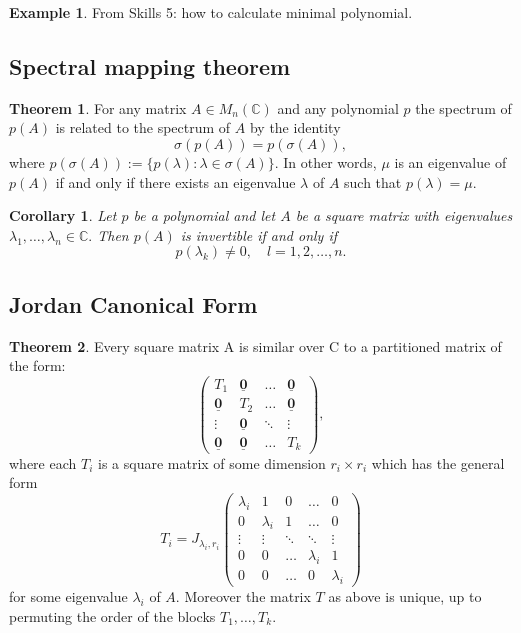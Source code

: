 \documentclass[12pt, a4paper]{article}
\newcommand{\bb}[1]{\mathbb{#1}}
\theoremstyle{definition}
\newtheorem{theorem}{Theorem}[section]
\newtheorem*{example}{Example}
\theoremstyle{plain}
\newtheorem{corollary}{Corollary}[theorem]
\begin{document}
\begin{example}
From Skills 5: how to calculate minimal polynomial.

\end{example}

\subsection{Spectral mapping theorem}

\begin{theorem}
For any matrix $A \in M_n(\bb{C})$ and any polynomial $p$ the spectrum of $p(A)$ is related to the spectrum of $A$ by the identity $$\sigma(p(A))=p(\sigma(A)),$$ where $p(\sigma(A)):=\{p(\lambda) : \lambda \in \sigma(A)\}.$ In other words, $\mu$ is an eigenvalue of $p(A)$ if and only if there exists an eigenvalue $\lambda$ of $A$ such that $p(\lambda) = \mu.$
\end{theorem}

\begin{corollary}
Let $p$ be a polynomial and let $A$ be a square matrix with eigenvalues $\lambda_1,\ldots,\lambda_n \in \bb{C}.$ Then $p(A)$ is invertible if and only if $$p(\lambda_k)\neq 0, \quad l=1,2,\ldots,n.$$
\end{corollary}

\subsection{Jordan Canonical Form}

\begin{theorem}
Every square matrix A is similar over C to a partitioned matrix of the form: $$\begin{pmatrix} T_1 & \underline{\mathbf{0}} & \ldots & \underline{\mathbf{0}} \\ \underline{\mathbf{0}} & T_2 & \ldots & \underline{\mathbf{0}} \\ \vdots & \underline{\mathbf{0}} & \ddots & \vdots \\ \underline{\mathbf{0}} & \underline{\mathbf{0}} & \ldots & T_k \end{pmatrix},$$ where each $T_i$ is a square matrix of some dimension $r_i \times r_i$ which has the general form $$T_i=J_{\lambda_i,r_i}\begin{pmatrix} \lambda_i&1&0&\ldots&0 \\ 0&\lambda_i&1&\ldots&0 \\ \vdots&\vdots&\ddots&\ddots&\vdots \\ 0&0&\ldots&\lambda_i&1 \\ 0&0&\ldots&0&\lambda_i \end{pmatrix}$$ for some eigenvalue $\lambda_i$ of $A.$ Moreover the matrix $T$ as above is unique, up to permuting the order of the blocks $T_1,\ldots,T_k.$
\end{theorem} 
\end{document}
